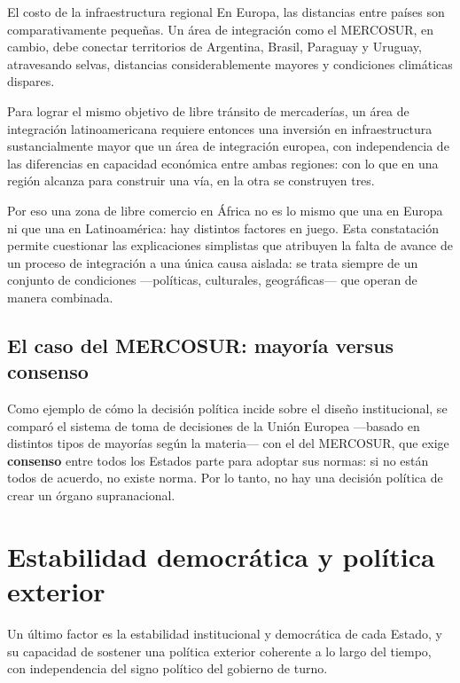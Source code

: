 \documentclass[12pt,oneside]{book}
\begin{document}
\begin{example}{El costo de la infraestructura regional}
En Europa, las distancias entre países son comparativamente pequeñas. Un área de integración como el MERCOSUR, en cambio, debe conectar territorios de Argentina, Brasil, Paraguay y Uruguay, atravesando selvas, distancias considerablemente mayores y condiciones climáticas dispares.

Para lograr el mismo objetivo de libre tránsito de mercaderías, un área de integración latinoamericana requiere entonces una inversión en infraestructura sustancialmente mayor que un área de integración europea, con independencia de las diferencias en capacidad económica entre ambas regiones: con lo que en una región alcanza para construir una vía, en la otra se construyen tres.
\end{example}

Por eso una zona de libre comercio en África no es lo mismo que una en Europa ni que una en Latinoamérica: hay distintos factores en juego. Esta constatación permite cuestionar las explicaciones simplistas que atribuyen la falta de avance de un proceso de integración a una única causa aislada: se trata siempre de un conjunto de condiciones —políticas, culturales, geográficas— que operan de manera combinada.

\subsection{El caso del MERCOSUR: mayoría versus consenso}

Como ejemplo de cómo la decisión política incide sobre el diseño institucional, se comparó el sistema de toma de decisiones de la Unión Europea —basado en distintos tipos de mayorías según la materia— con el del MERCOSUR, que exige \textbf{consenso} entre todos los Estados parte para adoptar sus normas: si no están todos de acuerdo, no existe norma. Por lo tanto, no hay una decisión política de crear un órgano supranacional.

\section{Estabilidad democrática y política exterior}

Un último factor es la estabilidad institucional y democrática de cada Estado, y su capacidad de sostener una política exterior coherente a lo largo del tiempo, con independencia del signo político del gobierno de turno.
\end{document}
